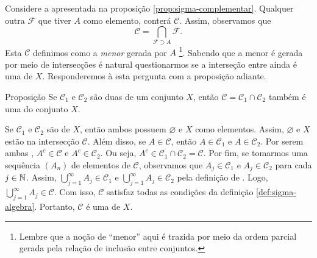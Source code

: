 Considere a \sigal apresentada na proposição \ref{prop:sigma-complementar}. 
Qualquer outra \sigal $\mathcal{F}$ que tiver $A$ como elemento, conterá $\mathcal{C}$.
Assim, observamos que 
$$
\mathcal{C} = \displaystyle \bigcap_{\mathcal{F} \supset A} \mathcal{F}.
$$
Esta \sigal $\mathcal{C}$   definimos como a \textit{menor} \sigal gerada por $A$ 
%
\footnote{Lembre que a noção de \enquote{menor} aqui é trazida por meio da ordem parcial gerada pela relação de inclusão entre conjuntos.}.
%
Sabendo que a menor \sigal é gerada por meio de intersecções é natural questionarmos se a interseção entre \sigals ainda é uma \sigal de $X$.
Responderemos à esta pergunta com a proposição adiante.

\begin{resultado}{Proposição}
\label{prop:interseção-2sigmas}
    Se $\mathcal{C}_1$ e $\mathcal{C}_2$ são duas \sigals de um conjunto $X$, então $\mathcal{C} = \mathcal{C}_1 \cap \mathcal{C}_2$ também é uma \sigal do conjunto $X$.
\end{resultado}

\begin{prova}
    Se $\mathcal{C}_1$ e $\mathcal{C}_2$ são \sigals de $X$, então ambos possuem $\varnothing$ e $X$ como elementos.
    Assim, $\varnothing$ e $X$ estão na intersecção $\mathcal{C}$.
    Além disso, se $A \in \mathcal{C}$, então $A \in \mathcal{C}_1$ e $A \in \mathcal{C}_2$. 
    Por serem ambas \sigals, $A^c \in \mathcal{C}$ e $A^c \in \mathcal{C}_2$.
    Ou seja, $A^c \in \mathcal{C}_1 \cap \mathcal{C}_2 = \mathcal{C}$.
    Por fim, se tomarmos uma sequência $(A_n)$ de elementos de $\mathcal{C}$, observamos que $A_j \in \mathcal{C}_1$ e $A_j \in \mathcal{C}_2$ para cada $j \in \operatorname{\mathbb{N}}$.
    Assim, $\displaystyle \bigcup_{j = 1}^\infty A_j \in \mathcal{C}_1$ e 
    $\displaystyle \bigcup_{j = 1}^\infty A_j \in \mathcal{C}_2$ pela definição de \sigal.
    Logo, $\displaystyle \bigcup_{j = 1}^\infty A_j \in \mathcal{C}$.
    Com isso, $\mathcal{C}$ satisfaz todas as condições da definição \ref{def:sigma-algebra}. 
    Portanto, $\mathcal{C}$ é uma \sigal de $X$.
\end{prova}

